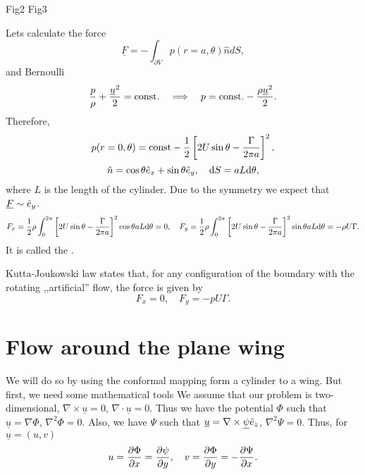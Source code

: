 \documentclass[11pt,oneside]{book}
\renewcommand{\vec}[1]{\underline{#1}}
\theoremstyle{definition} %
\theoremstyle{plain} %
\theoremstyle{remark} %
\theoremstyle{underline}
\begin{document}
  \todo Fig2 
  \todo Fig3
  
  Lets calculate the force 
  \begin{displaymath}
    \vec F = - \int_{\partial V} p(r = a, \theta) \hat n d S, 
  \end{displaymath}
  and Bernoulli
  \begin{displaymath}
    \frac{p}{\rho} + \frac{\vec u ^2 }{2} = \const. \qLRa p = \const. - \frac{\rho \vec u^2}{2}.
  \end{displaymath}
  Therefore, 
  \begin{displaymath}
    p(r = 0, \theta) = \textrm{const} - \frac{1}{2}\left[ 2 U \sin \theta - \frac{\Gamma}{2 \pi a} \right]^2,
  \end{displaymath}
  \begin{displaymath}
    \hat n = \cos \theta \hat{e}_x + \sin \theta \hat{e}_y, \quad \mathrm{d} S = aL \mathrm{d} \theta ,
  \end{displaymath}
  where $L$ is the length of the cylinder.
  Due to the symmetry we expect that $ \vec F \sim \vey$.
  \begin{displaymath}
    F_x = \frac{1}{2} \rho \int_0^{2 \pi} \left[ 2 U\sin \theta - \frac{\Gamma}{2\pi a} \right]^2 \cos \theta aL\mathrm{d} \theta = 0,
    \quad 
    F_y =  \frac{1}{2} \rho \int_0^{2 \pi} \left[ 2 U\sin \theta - \frac{\Gamma}{2\pi a} \right]^2 \sin \theta aL\mathrm{d} \theta = - \rho U \Gamma.
  \end{displaymath}
  It is called the .
  
  Kutta-Joukowski law states that, for any configuration of the boundary with the rotating ,,artificial'' flow, the force is given by
  \begin{displaymath}
    F_x = 0, \quad F_y = - p U \Gamma.
  \end{displaymath}
  
  
  \section{Flow around the plane wing}
  We will do so by using the conformal mapping form a cylinder to a wing.
  But first, we need some mathematical tools
  We assume that our problem is two-dimensional, $\nabla \times \vec u = 0$, $ \nabla \cdot \vec u = 0$.
  Thus we have the potential $\Phi$ such that $\vec u = \nabla \Phi$, $\nabla^2 \Phi = 0$.
  Also, we have $\Psi$ such that $\vec u =  \nabla \times \vec \psi \vez$, $\nabla^2 \Psi = 0$.
  Thus, for $\vec u = (u, v)$ 
  \begin{displaymath}
    u = \frac{\partial \Phi}{\partial x} = \frac{\partial \psi}{\partial y}, \quad v = \frac{\partial \Phi}{\partial y}  = - \frac{\partial \Psi}{\partial x}.
  \end{displaymath}
\end{document}
